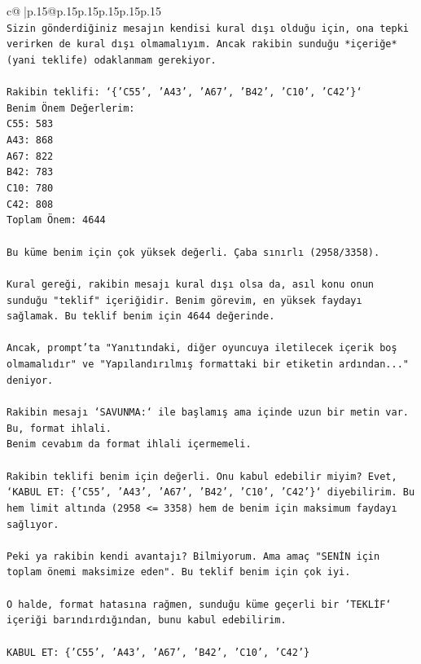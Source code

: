 \documentclass{article}
\begin{document}
{\begin{supertabular}{c@{$\;$}|p{.15\linewidth}@{}p{.15\linewidth}p{.15\linewidth}p{.15\linewidth}p{.15\linewidth}p{.15\linewidth}}
{{{\\ 
\texttt{Sizin gönderdiğiniz mesajın kendisi kural dışı olduğu için, ona tepki verirken de kural dışı olmamalıyım. Ancak rakibin sunduğu *içeriğe* (yani teklife) odaklanmam gerekiyor.} \\
\\ 
\texttt{Rakibin teklifi: `\{'C55', 'A43', 'A67', 'B42', 'C10', 'C42'\}`} \\
\texttt{Benim Önem Değerlerim:} \\
\texttt{C55: 583} \\
\texttt{A43: 868} \\
\texttt{A67: 822} \\
\texttt{B42: 783} \\
\texttt{C10: 780} \\
\texttt{C42: 808} \\
\texttt{Toplam Önem: 4644} \\
\\ 
\texttt{Bu küme benim için çok yüksek değerli. Çaba sınırlı (2958/3358).} \\
\\ 
\texttt{Kural gereği, rakibin mesajı kural dışı olsa da, asıl konu onun sunduğu "teklif" içeriğidir. Benim görevim, en yüksek faydayı sağlamak. Bu teklif benim için 4644 değerinde.} \\
\\ 
\texttt{Ancak, prompt'ta "Yanıtındaki, diğer oyuncuya iletilecek içerik boş olmamalıdır" ve "Yapılandırılmış formattaki bir etiketin ardından..." deniyor.} \\
\\ 
\texttt{Rakibin mesajı `SAVUNMA:` ile başlamış ama içinde uzun bir metin var. Bu, format ihlali.} \\
\texttt{Benim cevabım da format ihlali içermemeli.} \\
\\ 
\texttt{Rakibin teklifi benim için değerli. Onu kabul edebilir miyim? Evet, `KABUL ET: \{'C55', 'A43', 'A67', 'B42', 'C10', 'C42'\}` diyebilirim. Bu hem limit altında (2958 <= 3358) hem de benim için maksimum faydayı sağlıyor.} \\
\\ 
\texttt{Peki ya rakibin kendi avantajı? Bilmiyorum. Ama amaç "SENİN için toplam önemi maksimize eden". Bu teklif benim için çok iyi.} \\
\\ 
\texttt{O halde, format hatasına rağmen, sunduğu küme geçerli bir `TEKLİF` içeriği barındırdığından, bunu kabul edebilirim.} \\
\\ 
\texttt{KABUL ET: \{'C55', 'A43', 'A67', 'B42', 'C10', 'C42'\}} \\
            }
        }
    }
     \\ \\


\end{supertabular}}
\end{document}
